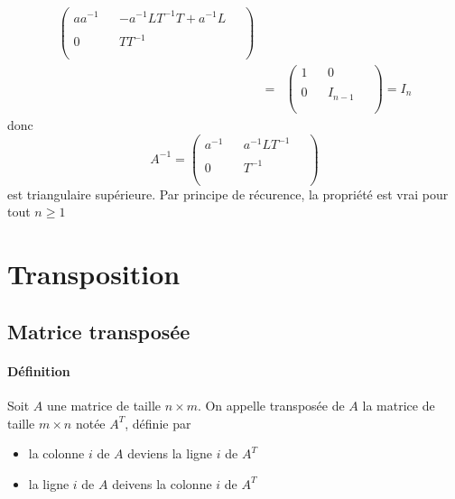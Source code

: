 \begin{enumerate}[(1)]
\begin{eqnarray*}
\begin{pmatrix}
        a a^{-1} &   & - a^{-1} L T^{-1} T + a^{-1} L & ~ \\
          &   &   & ~ \\
        0 &   & T T^{-1} & ~ \\
          &   &   & ~ \\
      \end{pmatrix}  \\ 
      &=&\begin{pmatrix}
        1 &   & 0 & ~ \\
          &   &   & ~ \\
        0 &   & I_{n-1} & ~ \\
          &   &   & ~ \\
      \end{pmatrix}
      = I_n
    \end{eqnarray*}
    donc
    $$A^{-1} = 
      \begin{pmatrix}
        a^{-1} &   & a^{-1} L T^{-1} & ~ \\
          &   &   &  ~  \\
        0 &   & T^{-1} & ~  \\
          &   &   &  ~ \\
      \end{pmatrix}$$
    est triangulaire supérieure. Par principe de récurence, la propriété est vrai pour tout $n \geq 1$
\end{enumerate} 
    

%
%
\section{Transposition}
%
%
%
\subsection{Matrice transposée}
%
\paragraph{Définition} Soit $A$ une matrice de taille $n\times m$. On appelle transposée de $A$ la matrice de taille $m\times n$ notée $A^T$, définie par
\begin{itemize}
  \item la colonne $i$ de $A$ deviens la ligne $i$ de $A^T$
  \item la ligne $i$ de $A$ deivens la colonne $i$ de $A^T$
\end{itemize}

